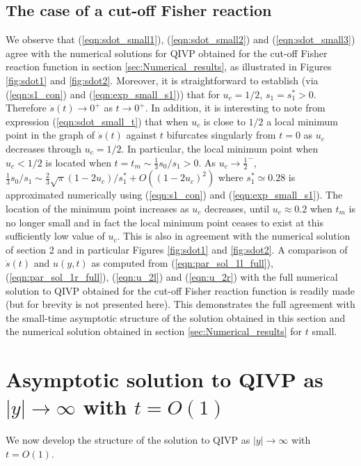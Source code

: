 \documentclass[11pt,a4paper]{article}
\newcommand{\eeref}[1]{(\ref{eqn:#1})}
\newcommand{\ffref}[1]{\ref{fig:#1}}
\newcommand{\ssref}[1]{\ref{sec:#1}}
\newcommand{\sslab}[1]{\label{sec:#1}}
\begin{document}
 \subsection{The  case of a cut-off Fisher reaction}
  We observe that \eeref{sdot_small1}, \eeref{sdot_small2} and \eeref{sdot_small3} agree with the numerical solutions for QIVP obtained for the cut-off Fisher reaction function in section \ssref{Numerical_results}, as illustrated in Figures  \ffref{sdot1} and \ffref{sdot2}.
Moreover,  it is straightforward to establish (via
\eeref{s1_con} and \eeref{exp_small_s1})
that for $u_c=1/2$,
$s_1=s_1^*>0$.
Therefore $\dot{s}(t) \to 0^+$ as $t\to 0^+$.
In addition, it is interesting to note from expression \eeref{sdot_small_t} that when
$u_c$ is close to $1/2$   a local minimum point in the graph of $\dot s(t)$ against $t$
bifurcates singularly from $t=0$ as $u_c$ decreases through $u_c=1/2$.
In particular, the local minimum point when $u_c<1/2$   
is located when
$t=t_m\sim \frac{1}{3}s_0/s_1>0$. 
As $u_c\to \frac{1}{2}^-$, 
  $ \frac{1}{3}s_0/s_1\sim \frac{2}{3}\sqrt{\pi}(1-2u_c)/s_1^*+O((1-2u_c)^2)$ 
 where $s_1^*\simeq 0.28$ is approximated numerically using  \eeref{s1_con} and \eeref{exp_small_s1}. 
 The location of the minimum point increases as 
  $u_c $ decreases,   until $u_c\approx 0.2$ when
 $t_m$ is no longer small and in fact  the local minimum point ceases to exist at this sufficiently low value of $u_c$.
%
This is also in agreement with the numerical solution of section 2 and in particular Figures \ffref{sdot1} and    \ffref{sdot2}.
A comparison of $\dot s(t)$ and $u(y,t)$ as computed from
 \eeref{par_sol_1l_full}, \eeref{par_sol_1r_full}, \eeref{u_2l} and \eeref{u_2r} with the full numerical solution to QIVP obtained for the cut-off Fisher reaction function
is readily made
(but for brevity is not presented here). This demonstrates
the full agreement
with the small-time asymptotic structure of the solution
obtained in this section and the numerical solution obtained in section \ssref{Numerical_results} for $t$ small.





\section{Asymptotic solution to QIVP  as $\lvert y \rvert \to \infty$  with $t=O(1)$} \sslab{large_spatial}



We now develop the structure of the solution to QIVP as $\lvert y \rvert \to \infty$ with $t=O(1)$. 
\end{document}
